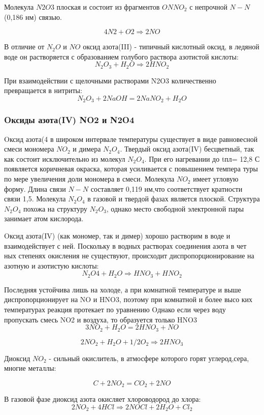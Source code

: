 \documentclass[11pt]{article}
\begin{document}
Молекула $N2O3$ плоская и состоит из фрагментов $ON NO_2$ с непрочной $N - N$ (0,186 нм) связью. 

$$4N 2 + O 2 \Rightarrow 2NO$$

В отличие от $N_2O$ и $NO$ оксид азота(III) - типичный кислотный оксид, в ледяной воде он растворяется с образованием голубого раствора азотистой кислоты: 
$$N _2 O _3 + H _2 O \Rightarrow 2HNO _2$$ 

При взаимодействии с щелочными растворами N2O3 количественно превращается в нитриты: 
$$N _2 O _3 + 2NaOH = 2NaNO _2 + H _2 O$$

\subsubsection{Oксиды азота(IV) NO2 и N2O4}
 Oксид азота(4 в широком интервале температуры существует в виде равновесной смеси мономера $NO_2$ и димера $N_2O_4$. 
Твердый оксид азота(IV) бесцветный, так как состоит исключительно из молекул $N_2O_4$. При его нагревании до tпл= 12,8 С появляется коричневая окраска, которая усиливается с повышением темпера туры по мере увеличения доли мономера в смеси. Молекула $NO_2$ имеет угловую форму. Длина связи $N-N$ составляет 0,119 нм,что соответствует кратности связи 1,5. Молекула $N_2O_4$ в газовой и твердой фазах является плоской. Структура $N_2O_4$ похожа на структуру $N_2O_3$, однако место свободной электронной пары занимает атом кислорода. 

Oксид азота(IV) (как мономер, так и димер) хорошо растворим в воде и взаимодействует с ней. Поскольку в водных растворах соединения азота в чет ных степенях окисления не существуют, происходит диспропорционирование на азотную и азотистую кислоты: 
$$N _2 O 4 + H _2 O \Rightarrow HNO _3 + HNO _2 $$


Последняя устойчива лишь на холоде, а при комнатной температуре и выше диспропорционирует на NO и HNO3, поэтому при комнатной и более высо ких температурах реакция протекает по уравнению 
Oднако если через воду пропускать смесь NO2 и воздуха, то образуется только HNO3 
$$3NO _2 + H _2 O = 2HNO _3 + NO $$

$$2NO _2 + H _2 O + 1/2O _2 \Rightarrow 2HNO _3 $$

Диоксид $NO_2$ - сильный окислитель, в атмосфере которого горят углерод,сера, многие металлы: 

$$C + 2NO _2 = CO _2 + 2NO $$

В газовой фазе диоксид азота окисляет хлороводород до хлора: 
$$2NO _2 + 4HCl \Rightarrow 2NOCl + 2H_2 O + Cl _2 $$
\end{document}
